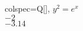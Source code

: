 \begin{table}
\centering
\begin{tblr}[         %
]                     %
{                     %
colspec={Q[]},
}                     %
\toprule
$y^2 = e^x$ \\ \midrule %
$-2$ \\
$-3.14$ \\
\bottomrule
\end{tblr}
\end{table} 
